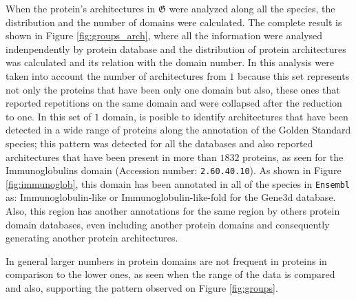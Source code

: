 \documentclass[12pt]{article}
\begin{document}
When the protein's architectures in $\boldsymbol{\mathfrak{G}}$ were analyzed 
along all the species, the distribution and the number of domains were 
calculated. The complete result is shown in Figure \ref{fig:groups_arch}, where 
all the information were analysed indenpendently by protein database and the 
distribution of protein architectures was calculated and its relation with the 
domain number. In this analysis were taken into account the number of 
architectures from $1$ because this set represents not only the proteins that 
have been only one domain but also, these ones that reported repetitions on the 
same domain and were collapsed after the reduction to one. In this set of $1$ 
domain, is posible to identify architectures that have been detected in a wide 
range of proteins along the annotation of the Golden Standard species; this 
pattern was detected for all the databases and also reported architectures that 
have been present in more than $1832$ proteins, as seen for the Immunoglobulins 
domain (Accession number: \texttt{2.60.40.10}). As shown in Figure 
\ref{fig:immunoglob}, this domain has been annotated in all of the 
species in \texttt{Ensembl} as: Immunoglobulin-like or 
Immunoglobulin-like-fold for the Gene3d database. Also, this region has another 
annotations for the same region by others protein domain databases, even 
including another protein domains and consequently generating another protein 
architectures. 

In general larger numbers in protein domains are not frequent in proteins in 
comparison to the lower ones, as seen when the range of the data is compared 
and also, supporting the pattern observed on Figure \ref{fig:groups}.
\end{document}
